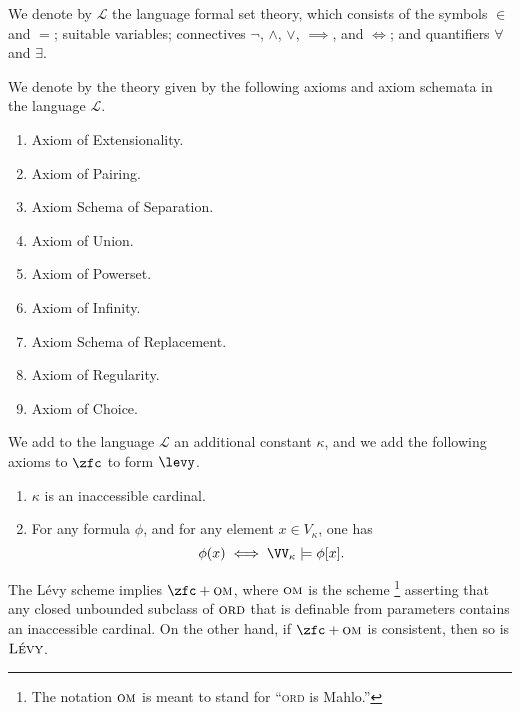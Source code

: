 \begin{notation}%
\label{ntn:ZFC}
	We denote by $\mathscr{L}$ the language formal set theory,
	which consists of the symbols $\in$ and $=$; suitable variables; connectives $\neg$, $\wedge$, $\vee$, $\implies$, and $\iff$; and quantifiers $\forall$ and $\exists$.

	We denote by \zfc the theory given by the following axioms and axiom schemata in the language $\mathscr{L}$.
	\begin{enumerate}
		\item Axiom of Extensionality.\cite[p. 4]{Jech:2003tt}
		\item Axiom of Pairing.\cite[p. 6]{Jech:2003tt}
		\item Axiom Schema of Separation.\cite[p. 7]{Jech:2003tt}
		\item Axiom of Union.\cite[p. 9]{Jech:2003tt}
		\item Axiom of Powerset.\cite[p. 9]{Jech:2003tt}
		\item Axiom of Infinity.\cite[p. 12]{Jech:2003tt}
		\item Axiom Schema of Replacement.\cite[p. 13]{Jech:2003tt}
		\item Axiom of Regularity.\cite[p. 63]{Jech:2003tt}
		\item Axiom of Choice.\cite[p. 47]{Jech:2003tt}
	\end{enumerate}
\end{notation}


\begin{axiom}%
\label{axm:Levy}
	We add to the language $\mathscr{L}$ an additional constant $\kappa$,
	and we add the following axioms to $\zfc$ to form  $\levy$.
	\begin{enumerate}
		\item $\kappa$ is an inaccessible cardinal.
		\item {} For any formula $\phi$, and for any element $x\in V_{\kappa}$, one has
		\[
			\phi(x)\iff \VV_{\kappa}\models\phi[x].
		\]
	\end{enumerate}
\end{axiom}

The Lévy scheme implies $\zfc+\textsc{om}$, where $\textsc{om}$ is the scheme%
\footnote{The notation $\textsc{om}$ is meant to stand for \enquote{\textsc{ord} is Mahlo.}}
asserting that any closed unbounded subclass of $\textsc{ord}$ that is definable from parameters contains an inaccessible cardinal.
On the other hand, if $\zfc+\textsc{om}$ is consistent, then so is $\textsc{Lévy}$.

